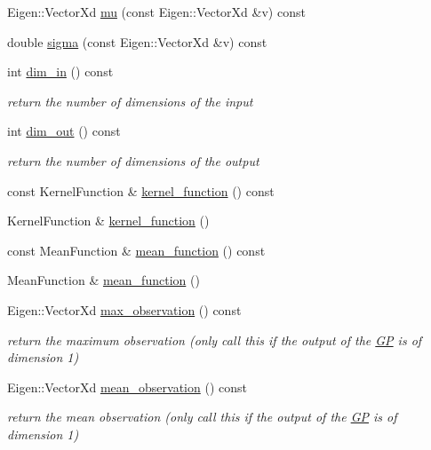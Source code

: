 \begin{DoxyCompactItemize}
Eigen\+::\+Vector\+Xd \hyperlink{classlimbo_1_1model_1_1_g_p_a5d26e30b8c53400cdf12058d83dc41f0}{mu} (const Eigen\+::\+Vector\+Xd \&v) const 
\item 
double \hyperlink{classlimbo_1_1model_1_1_g_p_a2ea153c1de2021740235cfa10822395d}{sigma} (const Eigen\+::\+Vector\+Xd \&v) const 
\item 
int \hyperlink{classlimbo_1_1model_1_1_g_p_a41d99e6a69d53fc7d9260d295f787bc3}{dim\+\_\+in} () const 
\begin{DoxyCompactList}\small\item\em return the number of dimensions of the input \end{DoxyCompactList}\item 
int \hyperlink{classlimbo_1_1model_1_1_g_p_a077144695f9f0b33b64d4feb8fb4e447}{dim\+\_\+out} () const 
\begin{DoxyCompactList}\small\item\em return the number of dimensions of the output \end{DoxyCompactList}\item 
const Kernel\+Function \& \hyperlink{classlimbo_1_1model_1_1_g_p_aaf794227fb4b8ba92bc22f15ec379d87}{kernel\+\_\+function} () const 
\item 
Kernel\+Function \& \hyperlink{classlimbo_1_1model_1_1_g_p_a442ffded72288fd9ea360ce1456f72a4}{kernel\+\_\+function} ()
\item 
const Mean\+Function \& \hyperlink{classlimbo_1_1model_1_1_g_p_a29be4dfec28fbf0ab970529a18a20c34}{mean\+\_\+function} () const 
\item 
Mean\+Function \& \hyperlink{classlimbo_1_1model_1_1_g_p_ad4a56a3630793def38840ea1c85c091e}{mean\+\_\+function} ()
\item 
Eigen\+::\+Vector\+Xd \hyperlink{classlimbo_1_1model_1_1_g_p_a480f1b249edf89bc6960512e8baceab8}{max\+\_\+observation} () const 
\begin{DoxyCompactList}\small\item\em return the maximum observation (only call this if the output of the \hyperlink{classlimbo_1_1model_1_1_g_p}{G\+P} is of dimension 1) \end{DoxyCompactList}\item 
Eigen\+::\+Vector\+Xd \hyperlink{classlimbo_1_1model_1_1_g_p_a802d8d4750626e6d38d83d36166000ac}{mean\+\_\+observation} () const 
\begin{DoxyCompactList}\small\item\em return the mean observation (only call this if the output of the \hyperlink{classlimbo_1_1model_1_1_g_p}{G\+P} is of dimension 1) \end{DoxyCompactList}\item 

\end{DoxyCompactItemize}
